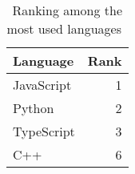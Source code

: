 \begin{table}[ht]
\centering
\caption{Ranking among the most used languages~\parencite{stateOfTheOctoverse23}}
\label{tab:githubMostUsedLanguageRanking23}
\begin{tabular}[t]{|l|r|}
\toprule
Language & Rank\\
\midrule
JavaScript & 1\\
Python & 2\\
TypeScript & 3\\
C++ & 6\\
\bottomrule
\end{tabular}
\end{table}
